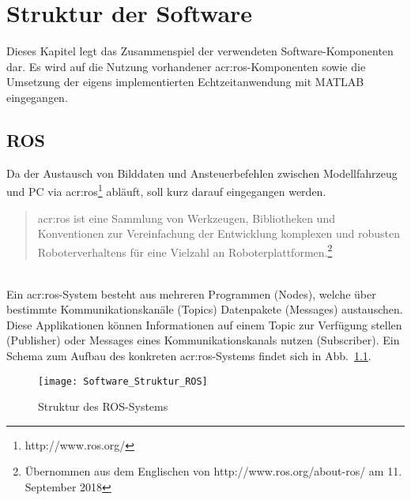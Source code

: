 \chapter{Struktur der Software \dcsecondauthorshort}
\label{cha:software_struktur}
Dieses Kapitel legt das Zusammenspiel der verwendeten Software-Komponenten dar. Es wird auf die Nutzung vorhandener \gls{acr:ros}-Komponenten sowie die Umsetzung der eigens implementierten Echtzeitanwendung mit MATLAB eingegangen.

\section{ROS \dcsecondauthorshort}
Da der Austausch von Bilddaten und Ansteuerbefehlen zwischen Modellfahrzeug und PC via \gls{acr:ros}\footnote{http://www.ros.org/} abläuft, soll kurz darauf eingegangen werden. 
\begin{quotation}
\gls{acr:ros} ist eine Sammlung von Werkzeugen, Bibliotheken und Konventionen zur Vereinfachung der Entwicklung komplexen und robusten Roboterverhaltens für eine Vielzahl an Roboterplattformen.\footnote{Übernommen aus dem Englischen von http://www.ros.org/about-ros/ am 11. September 2018}
\end{quotation}

\label{ssec:software_struktur:ros:nodes}
\ \\
Ein \gls{acr:ros}-System besteht aus mehreren Programmen (\glqq Nodes\grqq ), welche über bestimmte Kommunikationskanäle (\glqq Topics\grqq ) Datenpakete (\glqq Messages\grqq ) austauschen. Diese Applikationen können Informationen auf einem Topic zur Verfügung stellen (\glqq Publisher\grqq ) oder Messages eines Kommunikationskanals nutzen (\glqq Subscriber\grqq ). Ein Schema zum Aufbau des konkreten \gls{acr:ros}-Systems findet sich in Abb.~\ref{fig:software_struktur:ros}.

\begin{figure}[htbp]
	\centering
	\texttt{[image: Software\_Struktur\_ROS]}
	\caption{Struktur des ROS-Systems}
	\label{fig:software_struktur:ros}
\end{figure}

